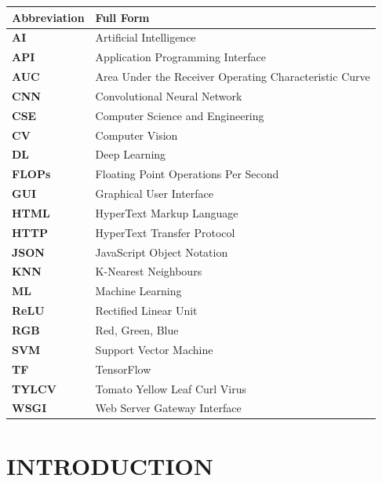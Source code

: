 \documentclass[12pt,a4paper]{report}
\begin{document}
\begin{longtable}{>{\bfseries}p{3cm} p{10.5cm}}
\toprule
\textbf{Abbreviation} & \textbf{Full Form} \\
\midrule
\endhead
AI    & Artificial Intelligence \\[3pt]
API   & Application Programming Interface \\[3pt]
AUC   & Area Under the Receiver Operating Characteristic Curve \\[3pt]
CNN   & Convolutional Neural Network \\[3pt]
CSE   & Computer Science and Engineering \\[3pt]
CV    & Computer Vision \\[3pt]
DL    & Deep Learning \\[3pt]
FLOPs & Floating Point Operations Per Second \\[3pt]
GUI   & Graphical User Interface \\[3pt]
HTML  & HyperText Markup Language \\[3pt]
HTTP  & HyperText Transfer Protocol \\[3pt]
JSON  & JavaScript Object Notation \\[3pt]
KNN   & K-Nearest Neighbours \\[3pt]
ML    & Machine Learning \\[3pt]
ReLU  & Rectified Linear Unit \\[3pt]
RGB   & Red, Green, Blue \\[3pt]
SVM   & Support Vector Machine \\[3pt]
TF    & TensorFlow \\[3pt]
TYLCV & Tomato Yellow Leaf Curl Virus \\[3pt]
WSGI  & Web Server Gateway Interface \\[3pt]
\bottomrule
\end{longtable}

\clearpage
{}
\setcounter{page}{1}

\chapter{INTRODUCTION}
\end{document}
